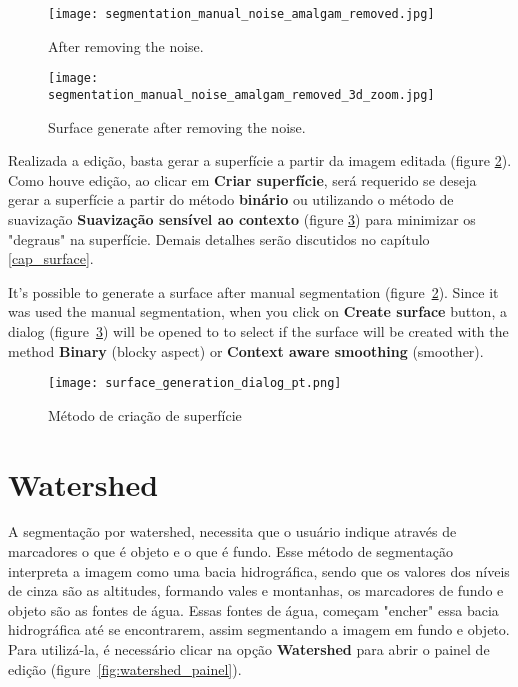 \begin{figure}[!htb]
\centering
\texttt{[image: segmentation\_manual\_noise\_amalgam\_removed.jpg]}
\caption{After removing the noise.}
\label{fig:editor_amalgaman}
\end{figure}

\begin{figure}[!htb]
\centering
\texttt{[image: segmentation\_manual\_noise\_amalgam\_removed\_3d\_zoom.jpg]}
\caption{Surface generate after removing the noise.}
\label{fig:surface_edited_amalgaman}
\end{figure}

Realizada a edição, basta gerar a superfície a partir da imagem editada (figure \ref{fig:surface_edited_amalgaman}). Como houve edição, ao clicar em \textbf{Criar superfície}, será requerido se deseja gerar a superfície a partir do método \textbf{binário} ou utilizando o método de suavização \textbf{Suavização sensível ao contexto} (figure \ref{fig:new_surface_edited}) para minimizar os "degraus" na superfície.  Demais detalhes serão discutidos no capítulo \ref{cap_surface}.

It's possible to generate a surface after manual segmentation (figure~\ref{fig:surface_edited_amalgaman}). Since it was used the manual segmentation, when you click on \textbf{Create surface} button, a dialog (figure~\ref{fig:new_surface_edited}) will be opened to  to select if the surface will be created with the method \textbf{Binary} (blocky aspect) or \textbf{Context aware smoothing} (smoother).


\begin{figure}[!htb]
\centering
\texttt{[image: surface\_generation\_dialog\_pt.png]}
\caption{Método de criação de superfície}
\label{fig:new_surface_edited}
\end{figure}


\section{Watershed}

A segmentação por watershed, necessita que o usuário indique através de marcadores o que é objeto e o que é fundo. Esse método de segmentação interpreta a imagem como uma bacia hidrográfica, sendo que os valores dos níveis de cinza são as altitudes, formando vales e montanhas, os marcadores de fundo e objeto são as fontes de água. Essas fontes de água, começam "encher" essa bacia hidrográfica até se encontrarem, assim segmentando a imagem em fundo e objeto. Para utilizá-la, é necessário clicar na opção \textbf{Watershed} para abrir o painel de edição (figure~\ref{fig:watershed_painel}).

